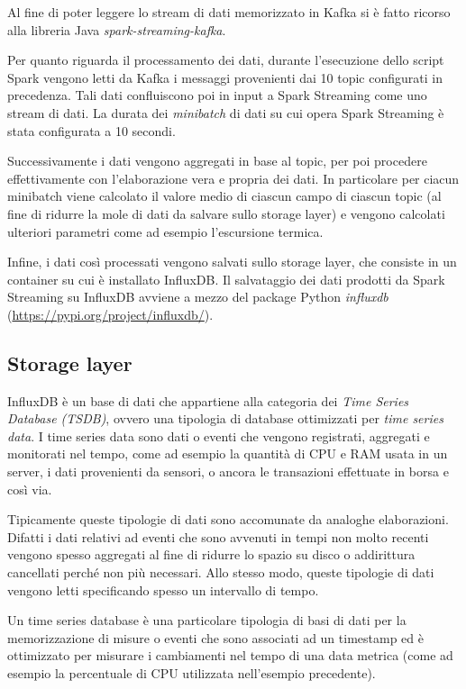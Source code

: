 Al fine di poter leggere lo stream di dati memorizzato in Kafka si è fatto ricorso alla libreria Java \textit{spark-streaming-kafka}.\par

Per quanto riguarda il processamento dei dati, durante l'esecuzione dello script Spark vengono letti da Kafka i messaggi provenienti dai 10 topic configurati in precedenza. Tali dati confluiscono poi in input a Spark Streaming come uno stream di dati. La durata dei \textit{minibatch} di dati su cui opera Spark Streaming è stata configurata a 10 secondi.\par

Successivamente i dati vengono aggregati in base al topic, per poi procedere effettivamente con l'elaborazione vera  e propria dei dati. In particolare per ciacun minibatch viene calcolato il valore medio di ciascun campo di ciascun topic (al fine di ridurre la mole di dati da salvare sullo storage layer) e vengono calcolati ulteriori parametri come ad esempio l'escursione termica.\par

Infine, i dati così processati vengono salvati sullo storage layer, che consiste in un container su cui è installato InfluxDB. Il salvataggio dei dati prodotti da Spark Streaming su InfluxDB avviene a mezzo del package Python \textit{influxdb} (\url{https://pypi.org/project/influxdb/}).

\subsection{Storage layer}
InfluxDB è un base di dati che appartiene alla categoria dei \textit{Time Series Database (TSDB)}, ovvero una tipologia di  database ottimizzati per \textit{time series data}. I time series data sono dati o eventi che vengono registrati, aggregati e monitorati nel tempo, come ad esempio la quantità di CPU e RAM usata in un server, i dati provenienti da sensori, o ancora le transazioni effettuate in borsa e così via.\par

Tipicamente queste tipologie di dati sono accomunate da analoghe elaborazioni. Difatti i dati relativi ad eventi che sono avvenuti in tempi non molto recenti vengono spesso aggregati al fine di ridurre lo spazio su disco o addirittura cancellati perché non più necessari. Allo stesso modo, queste tipologie di dati vengono letti specificando spesso un intervallo di tempo.

Un time series database è una particolare tipologia di basi di dati per la memorizzazione di misure o eventi che sono associati ad un timestamp ed è ottimizzato per misurare i cambiamenti nel tempo di una data metrica (come ad esempio la percentuale di CPU utilizzata nell'esempio precedente).

